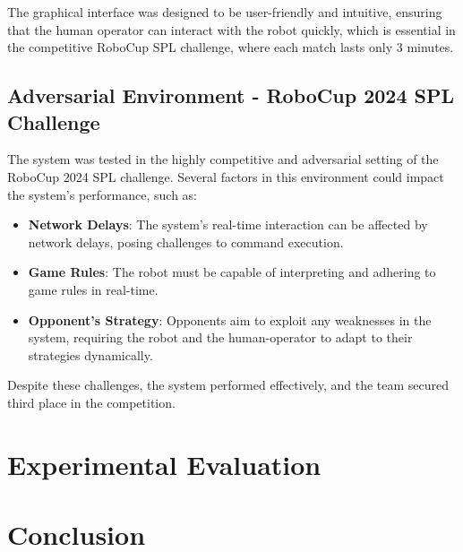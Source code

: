\documentclass[a4paper, onecolumn, 12pt]{article}
\begin{document}
The graphical interface was designed to be user-friendly and intuitive, ensuring that 
the human operator can interact with the robot quickly, which is essential in the 
competitive RoboCup SPL challenge, where each match lasts only 3 minutes.  

\subsection{Adversarial Environment - RoboCup 2024 SPL Challenge}  
The system was tested in the highly competitive and adversarial setting of the RoboCup 
2024 SPL challenge. Several factors in this environment could impact the system’s 
performance, such as:  
\begin{itemize}  
    \item \textbf{Network Delays}: The system’s real-time interaction can be affected 
    by network delays, posing challenges to command execution.  
    \item \textbf{Game Rules}: The robot must be capable of interpreting and adhering 
    to game rules in real-time.  
    \item \textbf{Opponent's Strategy}: Opponents aim to exploit any weaknesses in the 
    system, requiring the robot and the human-operator to adapt to their strategies dynamically.  
\end{itemize}  
Despite these challenges, the system performed effectively, and the team secured third 
place in the competition.  


\section{Experimental Evaluation} 

\section{Conclusion}
\label{sec:con}




\end{document}

